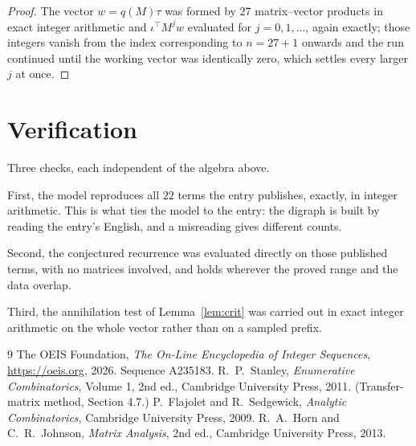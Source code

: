 \documentclass[11pt,a4paper]{article}
\theoremstyle{plain}
\theoremstyle{definition}
\begin{document}
\begin{proof}
The vector $w=q(M)\tau$ was formed by $27$ matrix--vector products in exact integer
arithmetic and $\iota^{\!\top}M^{j}w$ evaluated for $j=0,1,\dots$, again exactly; those
integers vanish from the index corresponding to $n=27+1$ onwards and the run continued
until the working vector was identically zero, which settles every larger $j$ at once.
\end{proof}

\section{Verification}

Three checks, each independent of the algebra above.

First, the model reproduces all $22$ terms the entry publishes, exactly, in integer
arithmetic. This is what ties the model to the entry: the digraph is built by reading the
entry's English, and a misreading gives different counts.

Second, the conjectured recurrence was evaluated directly on those published terms, with no
matrices involved, and holds wherever the proved range and the data overlap.

Third, the annihilation test of Lemma~\ref{lem:crit} was carried out in exact integer
arithmetic on the whole vector rather than on a sampled prefix.

\begin{thebibliography}{9}
 The OEIS Foundation, \emph{The On-Line Encyclopedia of Integer
Sequences}, \url{https://oeis.org}, 2026. Sequence A235183.
 R.~P.~Stanley, \emph{Enumerative Combinatorics}, Volume 1, 2nd ed.,
Cambridge University Press, 2011. (Transfer-matrix method, Section 4.7.)
 P.~Flajolet and R.~Sedgewick, \emph{Analytic Combinatorics}, Cambridge
University Press, 2009.
 R.~A.~Horn and C.~R.~Johnson, \emph{Matrix Analysis}, 2nd ed., Cambridge
University Press, 2013.
\end{thebibliography}
\end{document}
